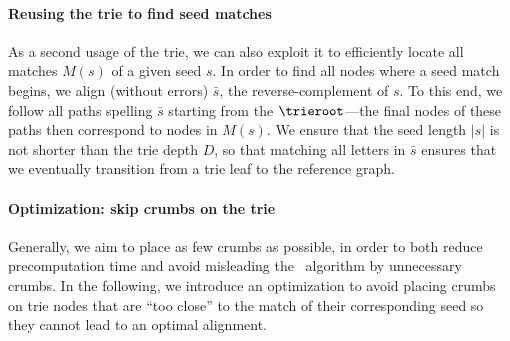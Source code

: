 \paragraph{Reusing the trie to find seed matches}
%
As a second usage of the trie, we can also exploit it to efficiently locate all
matches $M(s)$ of a given seed $s$.
%
In order to find all nodes where a seed match begins, we align (without errors)
$\bar{s}$, the reverse-complement of $s$. To this end, we follow all paths
spelling $\bar{s}$ starting from the $\trieroot$---the final nodes of these
paths then correspond to nodes in $M(s)$. We ensure that the seed length $|s|$
is not shorter than the trie depth $D$, so that matching all letters in
$\bar{s}$ ensures that we eventually transition from a trie leaf to the
reference graph.


\paragraph{Optimization: skip crumbs on the trie} \label{SEEDpar:skip_crumbs}
%
Generally, we aim to place as few crumbs as possible, in order to both reduce
precomputation time and avoid misleading the \A~algorithm by unnecessary crumbs.
In the following, we introduce an optimization to avoid placing crumbs on trie
nodes that are ``too close'' to the match of their corresponding seed so they
cannot lead to an optimal alignment.

